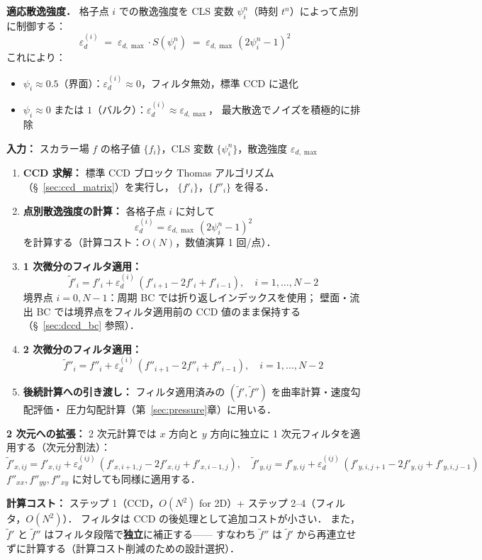 \textbf{適応散逸強度．}
格子点 $i$ での散逸強度を CLS 変数 $\psi_i^n$（時刻 $t^n$）によって点別に制御する：
\begin{equation}
  \varepsilon_d^{(i)} \;=\; \varepsilon_{d,\max} \cdot S(\psi_i^n)
  \;=\; \varepsilon_{d,\max}\,(2\psi_i^n - 1)^2
  \label{eq:adaptive_eps}
\end{equation}
これにより：
\begin{itemize}
  \item $\psi_i \approx 0.5$（界面）：$\varepsilon_d^{(i)} \approx 0$，フィルタ無効，標準 CCD に退化
  \item $\psi_i \approx 0$ または $1$（バルク）：$\varepsilon_d^{(i)} \approx \varepsilon_{d,\max}$，
        最大散逸でノイズを積極的に排除
\end{itemize}

\begin{tcolorbox}[algbox, title={適応 Dissipative-CCD フィルタの実装アルゴリズム}]
\label{alg:dccd}
\textbf{入力：} スカラー場 $f$ の格子値 $\{f_i\}$，CLS 変数 $\{\psi_i^n\}$，散逸強度 $\varepsilon_{d,\max}$

\begin{enumerate}
  \item \textbf{CCD 求解：}
        標準 CCD ブロック Thomas アルゴリズム（§~\ref{sec:ccd_matrix}）を実行し，
        $\{f'_i\}$，$\{f''_i\}$ を得る．
  \item \textbf{点別散逸強度の計算：}
        各格子点 $i$ に対して
        \[
          \varepsilon_d^{(i)} = \varepsilon_{d,\max}\,(2\psi_i^n - 1)^2
        \]
        を計算する（計算コスト：$O(N)$，数値演算 1 回/点）．
  \item \textbf{1 次微分のフィルタ適用：}
        \[
          \tilde{f}'_i = f'_i + \varepsilon_d^{(i)}\,(f'_{i+1} - 2f'_i + f'_{i-1}),
          \quad i = 1, \ldots, N-2
        \]
        境界点 $i=0, N-1$：周期 BC では折り返しインデックスを使用；
        壁面・流出 BC では境界点をフィルタ適用前の CCD 値のまま保持する（§~\ref{sec:dccd_bc} 参照）．
  \item \textbf{2 次微分のフィルタ適用：}
        \[
          \tilde{f}''_i = f''_i + \varepsilon_d^{(i)}\,(f''_{i+1} - 2f''_i + f''_{i-1}),
          \quad i = 1, \ldots, N-2
        \]
  \item \textbf{後続計算への引き渡し：}
        フィルタ適用済みの $(\tilde{f}', \tilde{f}'')$ を曲率計算・速度勾配評価・
        圧力勾配計算（第~\ref{sec:pressure}章）に用いる．
\end{enumerate}

\textbf{2 次元への拡張：}
2 次元計算では $x$ 方向と $y$ 方向に独立に 1 次元フィルタを適用する（次元分割法）：
\[
  \tilde{f}'_{x,ij} = f'_{x,ij} + \varepsilon_d^{(ij)}\,(f'_{x,i+1,j} - 2f'_{x,ij} + f'_{x,i-1,j}),
  \quad
  \tilde{f}'_{y,ij} = f'_{y,ij} + \varepsilon_d^{(ij)}\,(f'_{y,i,j+1} - 2f'_{y,ij} + f'_{y,i,j-1})
\]
$f''_{xx}, f''_{yy}, f''_{xy}$ に対しても同様に適用する．

\textbf{計算コスト：} ステップ 1（CCD，$O(N^2)$ for 2D）+ ステップ 2--4（フィルタ，$O(N^2)$）．
フィルタは CCD の後処理として追加コストが小さい．
また，$\tilde{f}'$ と $\tilde{f}''$ はフィルタ段階で\textbf{独立}に補正する——
すなわち $\tilde{f}''$ は $\tilde{f}'$ から再連立せずに計算する（計算コスト削減のための設計選択）．
\end{tcolorbox}
